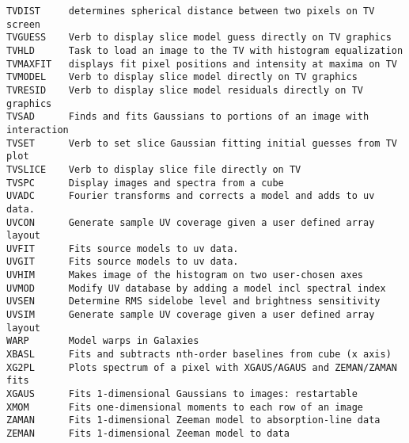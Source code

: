 \begin{verbatim}
TVDIST     determines spherical distance between two pixels on TV screen
TVGUESS    Verb to display slice model guess directly on TV graphics
TVHLD      Task to load an image to the TV with histogram equalization
TVMAXFIT   displays fit pixel positions and intensity at maxima on TV
TVMODEL    Verb to display slice model directly on TV graphics
TVRESID    Verb to display slice model residuals directly on TV graphics
TVSAD      Finds and fits Gaussians to portions of an image with interaction
TVSET      Verb to set slice Gaussian fitting initial guesses from TV plot
TVSLICE    Verb to display slice file directly on TV
TVSPC      Display images and spectra from a cube
UVADC      Fourier transforms and corrects a model and adds to uv data.
UVCON      Generate sample UV coverage given a user defined array layout
UVFIT      Fits source models to uv data.
UVGIT      Fits source models to uv data.
UVHIM      Makes image of the histogram on two user-chosen axes
UVMOD      Modify UV database by adding a model incl spectral index
UVSEN      Determine RMS sidelobe level and brightness sensitivity
UVSIM      Generate sample UV coverage given a user defined array layout
WARP       Model warps in Galaxies
XBASL      Fits and subtracts nth-order baselines from cube (x axis)
XG2PL      Plots spectrum of a pixel with XGAUS/AGAUS and ZEMAN/ZAMAN fits
XGAUS      Fits 1-dimensional Gaussians to images: restartable
XMOM       Fits one-dimensional moments to each row of an image
ZAMAN      Fits 1-dimensional Zeeman model to absorption-line data
ZEMAN      Fits 1-dimensional Zeeman model to data
\end{verbatim}\eve

\vfill\eject
{}

